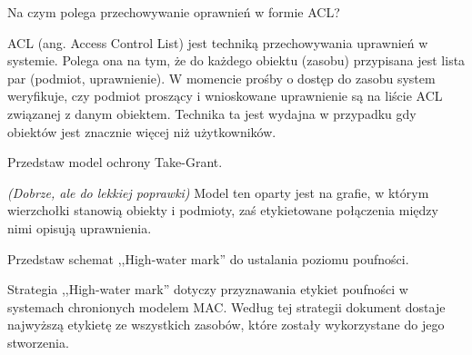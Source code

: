 \documentclass[answers,11pt]{exam}
\newcommand{\fixit}{\textit{(Dobrze, ale do lekkiej poprawki)} }
\begin{document}
\begin{questions}
\question Na czym polega przechowywanie oprawnień w formie ACL?
\begin{solution}
ACL (ang. Access Control List) jest techniką przechowywania uprawnień w systemie. Polega ona na tym, że do każdego obiektu (zasobu) przypisana jest lista par (podmiot, uprawnienie). W momencie prośby o dostęp do zasobu system weryfikuje, czy podmiot proszący i wnioskowane uprawnienie są na liście ACL związanej z danym obiektem. Technika ta jest wydajna w przypadku gdy obiektów jest znacznie więcej niż użytkowników.
\end{solution}

\question Przedstaw model ochrony Take-Grant.
\begin{solution}
\fixit
Model ten oparty jest na grafie, w którym wierzchołki stanowią obiekty i podmioty, zaś etykietowane połączenia między nimi opisują uprawnienia.
\end{solution}

\question Przedstaw schemat ,,High-water mark'' do ustalania poziomu poufności.
\begin{solution}
Strategia ,,High-water mark'' dotyczy przyznawania etykiet poufności w systemach chronionych modelem MAC. Według tej strategii dokument dostaje najwyższą etykietę ze wszystkich zasobów, które zostały wykorzystane do jego stworzenia.
\end{solution}


\end{questions}

\end{document}
